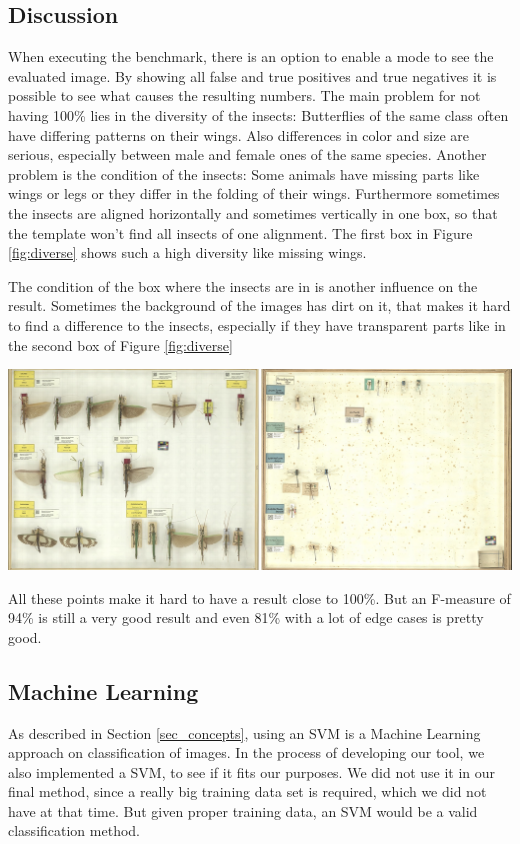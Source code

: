 \subsection{Discussion}
When executing the benchmark, there is an option to enable a mode to see the evaluated image.
By showing all false and true positives and true negatives it is possible to see what causes the resulting numbers.
The main problem for not having 100\% lies in the diversity of the insects:
Butterflies of the same class often have differing patterns on their wings.
Also differences in color and size are serious, especially between male and female ones of the same species.
Another problem is the condition of the insects:
Some animals have missing parts like wings or legs or they differ in the folding of their wings.
Furthermore sometimes the insects are aligned horizontally and sometimes vertically in one box, so that the template won't find all insects of one alignment.
The first box in Figure \ref{fig:diverse} shows such a high diversity like missing wings.

The condition of the box where the insects are in is another influence on the result.
Sometimes the background of the images has dirt on it, that makes it hard to find a difference to the insects, especially if they have transparent parts like in the second box of Figure \ref{fig:diverse}

\begin{center}
	\includegraphics[width=1\textwidth]{images/diversity_dirt.jpg}
	\label{fig:diverse}
\end{center}
All these points make it hard to have a result close to 100\%.
But an F-measure of 94\% is still a very good result and even 81\% with a lot of edge cases is pretty good.

\subsection{Machine Learning}
As described in Section \ref{sec_concepts}, using an SVM is a Machine Learning approach on classification of images.
In the process of developing our tool, we also implemented a SVM, to see if it fits our purposes.
We did not use it in our final method, since a really big training data set is required, which we did not have at that time.
But given proper training data, an SVM would be a valid classification method.

